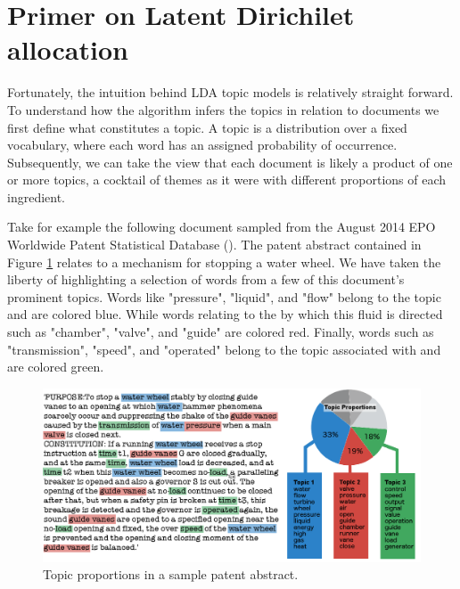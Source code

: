 


\section{Primer on Latent Dirichilet allocation} \label{ldaprimer}
Fortunately, the intuition behind LDA topic models is relatively straight forward. To understand how the algorithm infers the topics in relation to documents we first define what constitutes a topic. A topic is a distribution over a fixed vocabulary, where each word has an assigned probability of occurrence. Subsequently, we can take the view that each document is likely a product of one or more topics, a cocktail of themes as it were with different proportions of each ingredient.

Take for example the following document sampled from the August 2014 EPO Worldwide Patent Statistical Database (). The patent abstract contained in Figure \ref{fig:Patent_114} relates to a mechanism for stopping a water wheel. We have taken the liberty of highlighting a selection of words from a few of this document's prominent topics. Words like 
"pressure", "liquid", and "flow" belong to the  topic and are colored blue. While words relating to the  by which this fluid is directed such as "chamber", "valve", and "guide" are colored red. Finally, words such as "transmission", "speed", and "operated" belong to the topic associated with  and are colored green.

\begin{figure}[h]
\centering
\includegraphics[width=130mm,scale=0.45]{Figures/Patent114}
\decoRule
\caption[Patent114]{Topic proportions in a sample patent abstract.}
\label{fig:Patent_114}
\end{figure}


